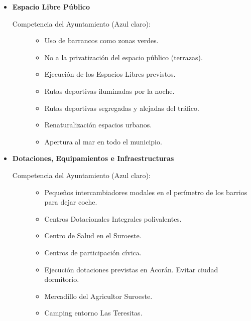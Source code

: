 \begin{itemize}
\begin{itemize}
        \item \textbf{Espacio Libre Público}
        \begin{description}
            \item[Competencia del Ayuntamiento (Azul claro):]
            \begin{itemize}
                \item Uso de barrancos como zonas verdes.
                \item No a la privatización del espacio público (terrazas).
                \item Ejecución de los Espacios Libres previstos.
                \item Rutas deportivas iluminadas por la noche.
                \item Rutas deportivas segregadas y alejadas del tráfico.
                \item Renaturalización espacios urbanos.
                \item Apertura al mar en todo el municipio.
            \end{itemize}
        \end{description}

        \item \textbf{Dotaciones, Equipamientos e Infraestructuras}
        \begin{description}
            \item[Competencia del Ayuntamiento (Azul claro):]
            \begin{itemize}
                \item Pequeños intercambiadores modales en el perímetro de los barrios para dejar coche.
                \item Centros Dotacionales Integrales polivalentes.
                \item Centro de Salud en el Suroeste.
                \item Centros de participación cívica.
                \item Ejecución dotaciones previstas en Acorán. Evitar ciudad dormitorio.
                \item Mercadillo del Agricultor Suroeste.
                \item Camping entorno Las Teresitas.
            \end{itemize}
        \end{description}


\end{itemize}
\end{itemize}
